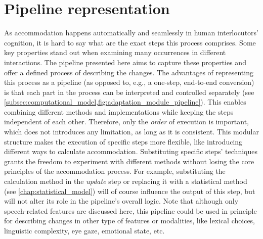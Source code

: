 \section{Pipeline representation}
\label{sec:pipeline_representation}

As accommodation  happens automatically and seamlessly in human interlocutors' cognition, it is hard to say what are the exact steps this process comprises.
Some key properties stand out when examining many occurrences in different interactions.
The pipeline presented here aims to capture these properties and offer a defined process of describing the changes.
The advantages of representing this process as a pipeline (as opposed to, e.g., a one-step, end-to-end conversion) is that each part in the process can be interpreted and controlled separately (see \cref{subsec:computational_model,fig:adaptation_module_pipeline}).
This enables combining different methods and implementations while keeping the steps independent of each other.
Therefore, only the \emph{order} of execution is important, which does not introduces any limitation, as long as it is consistent.
This modular structure makes the execution of specific steps more flexible, like introducing different ways to calculate accommodation.
Substituting specific steps' techniques grants the freedom to experiment with different methods without losing the core principles of the accommodation process.
For example, substituting the calculation method in the \textit{update} step or replacing it with a statistical method (see \cref{chap:statistical_model})
will of course influence the output of this step, but will not alter its role in the pipeline's overall logic.
Note that although only speech-related features are discussed here, this pipeline could be used in principle for describing changes in other type of features or modalities, like lexical choices, linguistic complexity, eye gaze, emotional state, etc.

